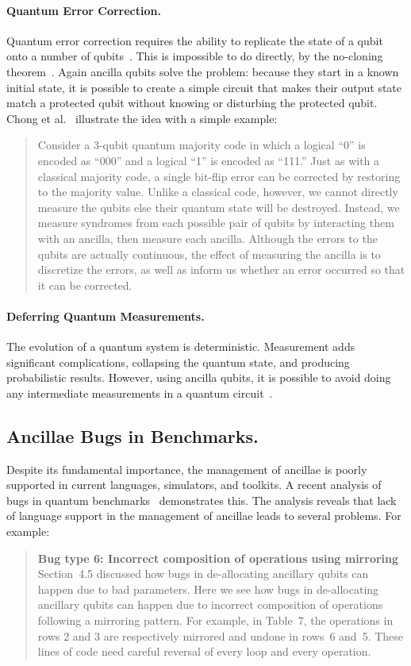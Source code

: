 \documentclass[sigplan,10pt,review,anonymous]{acmart}
\begin{document}
\paragraph*{Quantum Error Correction.}
Quantum error correction requires the ability to replicate the state of a
qubit onto a number of qubits~\cite[Ch.~3]{NAP25196}. This is impossible to do
directly, by the no-cloning
theorem~\cite{park1970concept,wootters1982single,dieks1982communication}. Again
ancilla qubits solve the problem: because they start in a known
initial state, it is possible to create a simple circuit that makes
their output state match a protected qubit without knowing or
disturbing the protected qubit. Chong et al.~\cite{sigarchblog}
illustrate the idea with a simple example:
\begin{quote}
Consider a 3-qubit quantum majority code in which a logical ``0'' is
encoded as ``000'' and a logical ``1'' is encoded as ``111.''  Just as with
a classical majority code, a single bit-flip error can be corrected by
restoring to the majority value.  Unlike a classical code, however, we
cannot directly measure the qubits else their quantum state will be
destroyed.  Instead, we measure syndromes from each possible pair of
qubits by interacting them with an ancilla, then measure each ancilla.
Although the errors to the qubits are actually continuous, the effect
of measuring the ancilla is to discretize the errors, as well as
inform us whether an error occurred so that it can be corrected.
\end{quote}

\paragraph*{Deferring Quantum Measurements.} The evolution of a
quantum system is deterministic. Measurement adds significant
complications, collapsing the quantum state, and producing
probabilistic results. However, using ancilla qubits, it is possible to
avoid doing any intermediate measurements in a quantum
circuit~\cite{dewolf}.

\subsection{Ancillae Bugs in Benchmarks.}
Despite its fundamental importance, the management of ancillae is
poorly supported in current languages, simulators, and toolkits.
A recent analysis of bugs in quantum
benchmarks~\cite{DBLP:conf/oopsla/HuangM18} demonstrates this. The analysis
reveals that lack of language support in the management of ancillae leads to
several problems. For example:
\begin{quote}
  \textbf{Bug type 6: Incorrect composition of operations using mirroring}
  Section~4.5 discussed how bugs in de-allocating ancillary qubits can
  happen due to bad parameters. Here we see how bugs in de-allocating
  ancillary qubits can happen due to incorrect composition of
  operations following a mirroring pattern. For example, in Table~7,
  the operations in rows 2 and 3 are respectively mirrored and undone
  in rows~6 and~5. These lines of code need careful reversal of every
  loop and every operation.
\end{quote}
\end{document}
